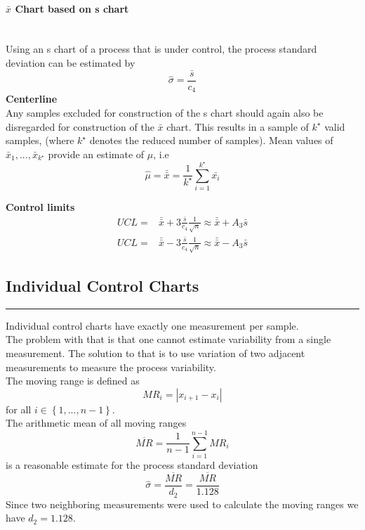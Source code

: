 \paragraph{$\bar{x}$ Chart based on s chart}\mbox{}\\
Using an s chart of a process that is under control, the process standard deviation can be estimated by
\begin{equation}
  \hat{\sigma} = \frac{\bar{s}}{c_4}
\end{equation}
\textbf{Centerline}\\
Any samples excluded for construction of the s chart should again also be disregarded for construction of the $\bar{x}$ chart.
This results in a sample of $k^\star$ valid samples, (where $k^\star$ denotes the reduced number of samples).
Mean values of $\bar{x}_1, ... ,\bar{x}_{k^\star}$ provide an estimate of $\mu$, i.e
\begin{equation}
  \hat{\mu} = \bar{\bar{x}} = \frac{1}{k^\star} \sum^{k^\star}_{i=1} \bar{x_i}
\end{equation}

\textbf{Control limits}
\begin{equation}
  \begin{split}
    UCL =& \bar{\bar{x}} + 3\frac{\bar{s}}{c_4} \frac{1}{\sqrt{n}} \approx \bar{\bar{x}} + A_3 \bar{s}\\
    UCL =& \bar{\bar{x}} - 3\frac{\bar{s}}{c_4} \frac{1}{\sqrt{n}} \approx \bar{\bar{x}} - A_3 \bar{s}
  \end{split}
\end{equation}

\subsection{Individual Control Charts}
\noindent\rule[\linienAbstand]{\linewidth}{\linienDicke}
Individual control charts have exactly one measurement per sample.\\
The problem with that is that one cannot estimate variability from a single measurement. The solution to that is to use variation of two adjacent measurements to measure the process variability.\\

The moving range is defined as
\begin{equation}
  MR_i = |x_{i+1} - x_i|
\end{equation}
for all $i \in \left\{1,...,n-1\right\}$.\\

The arithmetic mean of all moving ranges
\begin{equation}
  \overline{MR} = \frac{1}{n-1} \sum_{i=1}^{n-1}MR_i
\end{equation}
is a reasonable estimate for the process standard deviation
\begin{equation}
  \hat{\sigma} = \frac{\overline{MR}}{d_2} = \frac{\overline{MR}}{1.128}
\end{equation}
Since two neighboring measurements were used to calculate the moving ranges we have $d_2 = 1.128$.\\

